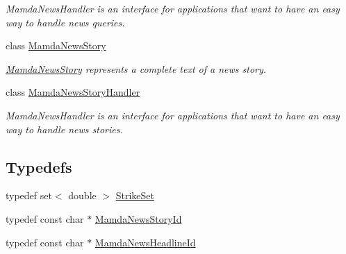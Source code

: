 \begin{CompactItemize}
\begin{CompactList}\small\item\em Mamda\-News\-Handler is an interface for applications that want to have an easy way to handle news queries. \item\end{CompactList}\item 
class \hyperlink{classWombat_1_1MamdaNewsStory}{Mamda\-News\-Story}
\begin{CompactList}\small\item\em \hyperlink{classWombat_1_1MamdaNewsStory}{Mamda\-News\-Story} represents a complete text of a news story. \item\end{CompactList}\item 
class \hyperlink{classWombat_1_1MamdaNewsStoryHandler}{Mamda\-News\-Story\-Handler}
\begin{CompactList}\small\item\em Mamda\-News\-Handler is an interface for applications that want to have an easy way to handle news stories. \item\end{CompactList}\end{CompactItemize}
\subsection*{Typedefs}
\begin{CompactItemize}
\item 
typedef set$<$ double $>$ \hyperlink{namespaceWombat_302d481a195bac5c9315c82cdbc79447}{Strike\-Set}
\item 
typedef const char $\ast$ \hyperlink{namespaceWombat_f7b94f4bb44eb78420c0d3ba0413424e}{Mamda\-News\-Story\-Id}
\item 
typedef const char $\ast$ \hyperlink{namespaceWombat_cb354a5fc91d5b728f8f1255aae3e196}{Mamda\-News\-Headline\-Id}
\end{CompactItemize}
